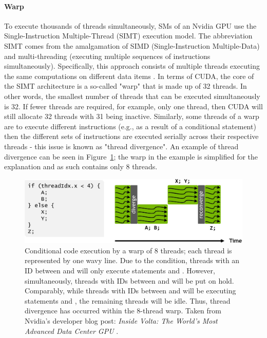 \paragraph{Warp}\label{Paragraph:theory-CUDA-thread-management-warp}
To execute thousands of threads simultaneously, SMs of an Nvidia GPU use the Single-Instruction Multiple-Thread (SIMT) execution model. The abbreviation SIMT comes from the amalgamation of SIMD (Single-Instruction Multiple-Data) and multi-threading (executing multiple sequences of instructions simultaneously). Specifically, this approach consists of multiple threads executing the same computations on different data items \cite{Marziale2010}. In terms of CUDA, the core of the SIMT architecture is a so-called "warp" that is made up of 32 threads. In other words, the smallest number of threads that can be executed simultaneously is 32. If fewer threads are required, for example, only one thread, then CUDA will still allocate 32 threads with 31 being inactive. Similarly, some threads of a warp are to execute different instructions (e.g., as a result of a conditional statement) then the different sets of instructions are executed serially across their respective threads - this issue is known as "thread divergence". An example of thread divergence can be seen in Figure~\ref{Figure:theory-CUDA-warp-thread-divergence}; the warp in the example is simplified for the explanation and as such contains only 8 threads.

\begin{figure}[ht!]
	\centering
	\includegraphics[width=14cm, keepaspectratio]{images/ch1/CUDA_warp_divergence_execution_path.jpg}
	\caption{Conditional code execution by a warp of 8 threads; each thread is represented by one wavy line. Due to the condition, threads with an ID between  and  will only execute statements  and . However, simultaneously, threads with IDs between  and  will be put on hold. Comparably, while threads with IDs between  and  will be executing statements  and , the remaining threads will be idle. Thus, thread divergence has occurred within the 8-thread warp. Taken from Nvidia's developer blog post: \emph{Inside Volta: The World's Most Advanced Data Center GPU} \cite{Durant10May2017}.}
	\label{Figure:theory-CUDA-warp-thread-divergence}
\end{figure}

